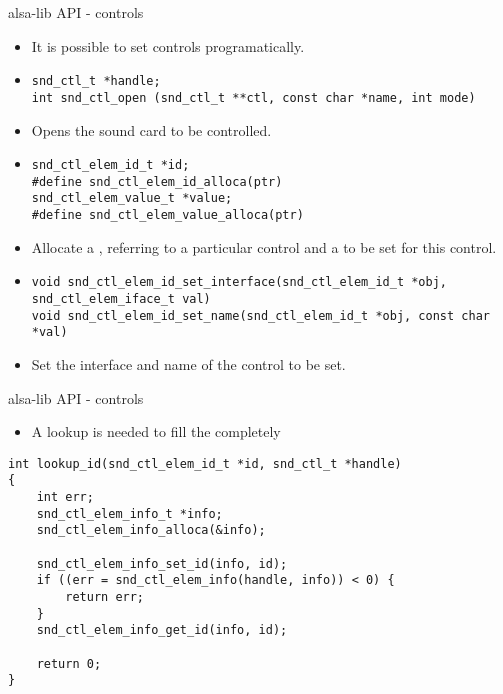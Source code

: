 \begin{frame}[fragile]{alsa-lib API - controls}
  \begin{itemize}
  \item It is possible to set controls programatically.
  \item
    \begin{block}{}
    \fontsize{9}{9}\selectfont
      \begin{verbatim}
snd_ctl_t *handle;
int snd_ctl_open (snd_ctl_t **ctl, const char *name, int mode)
      \end{verbatim}
    \end{block}
    \item Opens the sound card to be controlled.
  \item
    \begin{block}{}
    \fontsize{9}{9}\selectfont
      \begin{verbatim}
snd_ctl_elem_id_t *id;
#define snd_ctl_elem_id_alloca(ptr)
snd_ctl_elem_value_t *value;
#define snd_ctl_elem_value_alloca(ptr)
      \end{verbatim}
    \end{block}
  \item Allocate a , referring to a particular
    control and a  to be set for this
    control.
  \item
    \begin{block}{}
    \fontsize{9}{9}\selectfont
      \begin{verbatim}
void snd_ctl_elem_id_set_interface(snd_ctl_elem_id_t *obj, snd_ctl_elem_iface_t val)
void snd_ctl_elem_id_set_name(snd_ctl_elem_id_t *obj, const char *val)
      \end{verbatim}
    \end{block}
    \item Set the interface and name of the control to be set.
  \end{itemize}
\end{frame}

\begin{frame}[fragile]{alsa-lib API - controls}
  \begin{itemize}
  \item A lookup is needed to fill the 
    completely
  \end{itemize}
  \begin{block}{}
    \fontsize{9}{9}\selectfont
    \begin{verbatim}
int lookup_id(snd_ctl_elem_id_t *id, snd_ctl_t *handle)
{
    int err;
    snd_ctl_elem_info_t *info;
    snd_ctl_elem_info_alloca(&info);

    snd_ctl_elem_info_set_id(info, id);
    if ((err = snd_ctl_elem_info(handle, info)) < 0) {
        return err;
    }
    snd_ctl_elem_info_get_id(info, id);

    return 0;
}
    \end{verbatim}
  \end{block}
\end{frame}


